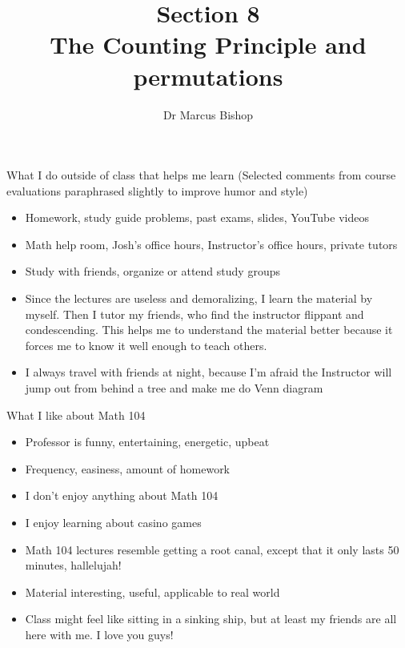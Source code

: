 \documentclass[handout]{beamer}
\title[\S8]{Section 8\\The Counting Principle and permutations}
\author{Dr Marcus Bishop}
\theoremstyle{definition}
\begin{document}
\begin{frame}\titlepage\end{frame}
\LogoOff

\begin{frame}
{What I do outside of class that helps me learn}
(Selected comments from course evaluations
paraphrased slightly to improve humor and style)
\begin{itemize}
\item Homework, study guide problems, past exams, slides,
YouTube videos
\item Math help room, Josh's office hours, Instructor's office hours,
private tutors
\item Study with friends, organize or attend study groups
\item Since the lectures are useless and demoralizing, I learn the
material by myself. Then I tutor my friends, who
find the instructor flippant and condescending.
This helps me to understand the material better because
it forces me to know it well enough to teach others.
\item I always travel with friends at night, because I'm afraid the
Instructor will jump out from behind a tree and make me do Venn diagram
\end{itemize}
\end{frame}

\begin{frame}{What I like about Math 104}
\begin{itemize}
\item Professor is funny, entertaining, energetic, upbeat
\item Frequency, easiness, amount of homework
\item I don't enjoy anything about Math 104
\item I enjoy learning about casino games
\item Math 104 lectures resemble
getting a root canal, except that it only lasts 50 minutes, hallelujah!
\item Material interesting, useful, applicable to real world
\item Class might feel like sitting in a sinking ship,
but at least my friends are all here with me. I love you guys!
\end{itemize}
\end{frame}
\end{document}
